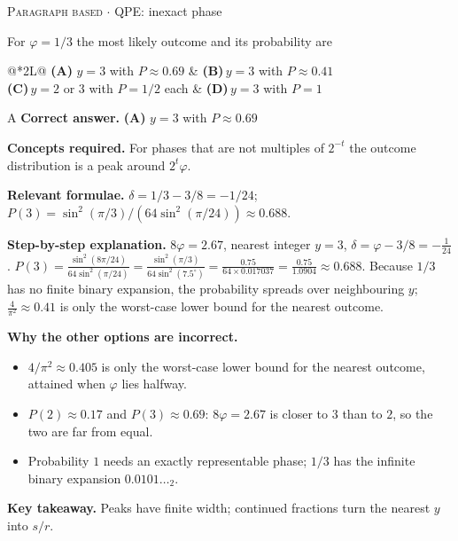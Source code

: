 \documentclass[11pt,a4paper]{article}
\newcommand{\optlabel}[1]{\textbf{(#1)}}
\newcommand{\correctlabel}[1]{\textcolor{okgreen}{\textbf{(#1)}\,\ding{51}}}
\newenvironment{qitem}[1]{\begin{list}{}{\setlength{\leftmargin}{3.3em}\setlength{\labelwidth}{3.1em}%
  \setlength{\labelsep}{0.2em}\setlength{\topsep}{3pt}\setlength{\parsep}{3pt}}\item[\textbf{Q.#1}\hfill]}{\end{list}}
\newcommand{\qsep}{\par\vspace{2pt}{\color{black!15}\hrule}\vspace{4pt}}
\newcommand{\qmeta}[2]{{\footnotesize\color{black!60}\textsc{#1} \;$\cdot$\; #2}\par}
\begin{document}
\begin{qitem}{40}
\qmeta{Paragraph based}{QPE: inexact phase}
For $\varphi = 1/3$ the most likely outcome and its probability are
\par\smallskip\noindent\begin{tabularx}{\linewidth}{@{}*{2}{L}@{}}
\correctlabel{A}\,$y = 3$ with $P \approx 0.69$ & \optlabel{B}\,$y = 3$ with $P \approx 0.41$ \\[3pt]
\optlabel{C}\,$y = 2$ or $3$ with $P = 1/2$ each & \optlabel{D}\,$y = 3$ with $P = 1$
\end{tabularx}
\end{qitem}
\begin{solbox}{A}
\textbf{\color{brand}Correct answer.} \textcolor{okgreen}{\textbf{(A)}} $y = 3$ with $P \approx 0.69$

\textbf{\color{brand}Concepts required.} For phases that are not multiples of $2^{-t}$ the outcome distribution is a peak around $2^t\varphi$.

\textbf{\color{brand}Relevant formulae.} $\delta = 1/3 - 3/8 = -1/24$; $P(3) = \sin^2(\pi/3)/(64\sin^2(\pi/24)) \approx 0.688$.

\textbf{\color{brand}Step-by-step explanation.} $8\varphi = 2.67$, nearest integer $y = 3$, $\delta = \varphi - 3/8 = -\frac{1}{24}$. $P(3) = \frac{\sin^2(8\pi/24)}{64\sin^2(\pi/24)} = \frac{\sin^2(\pi/3)}{64\sin^2(7.5^\circ)}
= \frac{0.75}{64\times0.017037} = \frac{0.75}{1.0904} \approx 0.688$. Because $1/3$ has no finite binary expansion, the probability spreads over neighbouring $y$;
$\frac{4}{\pi^2} \approx 0.41$ is only the worst-case lower bound for the nearest outcome.

\textbf{\color{brand}Why the other options are incorrect.}
\begin{itemize}[leftmargin=2.4em, itemsep=1pt, topsep=2pt]
\item[\textbf{(B)}] $4/\pi^2 \approx 0.405$ is only the worst-case lower bound for the nearest outcome, attained when $\varphi$ lies halfway.
\item[\textbf{(C)}] $P(2) \approx 0.17$ and $P(3) \approx 0.69$: $8\varphi = 2.67$ is closer to $3$ than to $2$, so the two are far from equal.
\item[\textbf{(D)}] Probability $1$ needs an exactly representable phase; $1/3$ has the infinite binary expansion $0.0101\ldots_2$.
\end{itemize}
\textbf{\color{brand}Key takeaway.} Peaks have finite width; continued fractions turn the nearest $y$ into $s/r$.
\end{solbox}
\qsep
\end{document}
